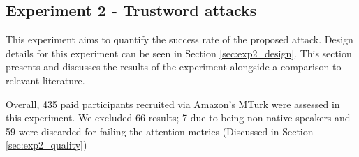 
\subsection{Experiment 2 - Trustword attacks}

\begin{table*}[t]
    \caption{Success rates for simulated attacks}
    \label{tab:exp2_attacks}
\end{table*}

\label{sec:exp2}
This experiment aims to quantify the success rate of the proposed attack. Design details for this experiment can be seen in Section \ref{sec:exp2_design}. This section presents and discusses the results of the experiment alongside a comparison to relevant literature.

Overall, 435 paid participants recruited via Amazon's MTurk were assessed in this experiment. We excluded 66 results; 7 due to being non-native speakers and 59 were discarded for failing the attention metrics (Discussed in Section \ref{sec:exp2_quality})

